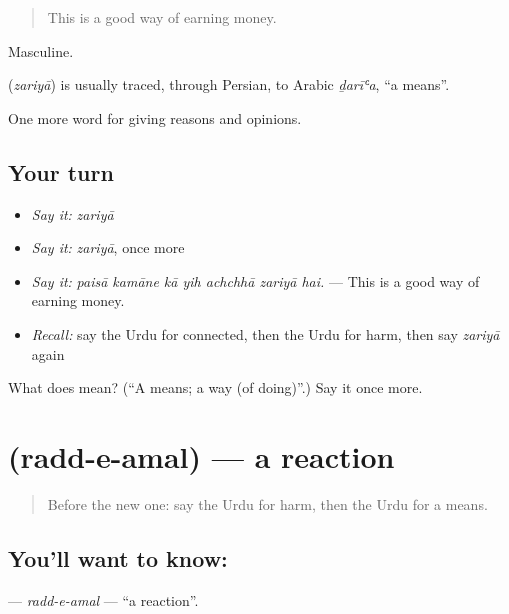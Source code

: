 \begin{quote}
This is a good way of earning money.
\end{quote}

Masculine.

\begin{cousinweb}
\textbf{} (\emph{zariyā}) is usually traced, through Persian, to Arabic \emph{ḏarīʿa}, \textquotedblleft{}a means\textquotedblright{}.
\end{cousinweb}

\begin{grammarlens}[title={What you've built}]
One more word for giving reasons and opinions.
\end{grammarlens}

\subsection*{Your turn}
\begin{itemize}
\raggedright
  \item \emph{Say it:} \emph{zariyā}
  \item \emph{Say it:} \emph{zariyā}, once more
  \item \emph{Say it:} \emph{paisā kamāne kā yih achchhā zariyā hai.} — This is a good way of earning money.
  \item \emph{Recall:} say the Urdu for connected, then the Urdu for harm, then say \emph{zariyā} again
\end{itemize}

\begin{tcolorbox}[breakable,colback=teal!4,colframe=teal!35!black,title={Before you move on}]
What does  mean? (\textquotedblleft{}A means; a way (of doing)\textquotedblright{}.) Say it once more.
\end{tcolorbox}
\section[\texorpdfstring{\ur{رد} \ur{عمل} (radd-e-amal)}{رد عمل (radd-e-amal)}]{  (radd-e-amal) — a reaction}

\label{lesson:UR-C332-radd-e-amal}



\begin{quote}
Before the new one: say the Urdu for harm, then the Urdu for a means.
\end{quote}

\subsection*{You'll want to know:  }
\textbf{ } — \emph{radd-e-amal} — \textquotedblleft{}a reaction\textquotedblright{}.

